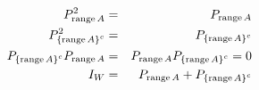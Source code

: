 \begin{eqnarray}
P_{%
\mathop{\rm range}%
A}^{2} &=&P_{%
\mathop{\rm range}%
A}  \nonumber \\
P_{\left\{ 
\mathop{\rm range}%
A\right\} ^{c}}^{2} &=&P_{\left\{ 
\mathop{\rm range}%
A\right\} ^{c}}  \nonumber \\
P_{\left\{ 
\mathop{\rm range}%
A\right\} ^{c}}P_{%
\mathop{\rm range}%
A} &=&P_{%
\mathop{\rm range}%
A}P_{\left\{ 
\mathop{\rm range}%
A\right\} ^{c}}=0  \nonumber \\
I_{W} &=&P_{%
\mathop{\rm range}%
A}+P_{\left\{ 
\mathop{\rm range}%
A\right\} ^{c}}
\end{eqnarray}

